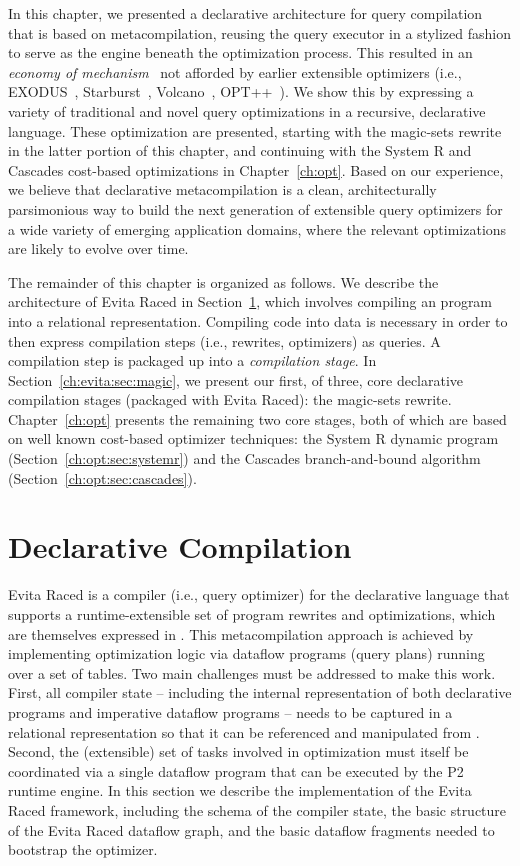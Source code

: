 In this chapter, we presented a declarative architecture for query compilation
that is based on metacompilation, reusing the query executor in a stylized
fashion to serve as the engine beneath the optimization process.  This resulted
in an {\em economy of mechanism}~\cite{Saltzer75theprotection} not afforded by
earlier extensible optimizers (i.e., EXODUS~\cite{exodus},
Starburst~\cite{phh92}, Volcano~\cite{volcano}, OPT++~\cite{opt++}).  We show
this by expressing a variety of traditional and novel query optimizations in a
recursive, declarative language.  These optimization are presented, starting
with the magic-sets rewrite in the latter portion of this chapter, and
continuing with the System R and Cascades cost-based optimizations in
Chapter~\ref{ch:opt}.  Based on our experience, we believe that declarative
metacompilation is a clean, architecturally parsimonious way to build the next
generation of extensible query optimizers for a wide variety of emerging
application domains, where the relevant optimizations are likely to evolve over
time.

The remainder of this chapter is organized as follows.  We describe the
architecture of Evita Raced in Section~\ref{ch:evita:sec:compile}, which
involves compiling an \OVERLOG program into a relational representation.
Compiling code into data is necessary in order to then express compilation
steps (i.e., rewrites, optimizers) as queries.  A compilation step is packaged
up into a {\em compilation stage}.  In Section~\ref{ch:evita:sec:magic}, we
present our first, of three, core declarative compilation stages (packaged with
Evita Raced): the magic-sets rewrite.  Chapter~\ref{ch:opt} presents the
remaining two core stages, both of which are based on well known cost-based
optimizer techniques: the System R dynamic program
(Section~\ref{ch:opt:sec:systemr}) and the Cascades branch-and-bound algorithm
(Section~\ref{ch:opt:sec:cascades}).


\section{Declarative Compilation}
\label{ch:evita:sec:compile}

Evita Raced is a compiler (i.e., query optimizer) for the \OVERLOG
declarative language that supports a runtime-extensible set of program
rewrites and optimizations, which are themselves expressed in \OVERLOG.
This metacompilation approach is achieved by implementing optimization
logic via dataflow programs  (query plans) running over a set of tables.  Two
main challenges must be addressed to make this work.  First, all
compiler state -- including the internal representation of both
declarative \OVERLOG programs and imperative dataflow programs -- needs
to be captured in a relational representation so that it can be
referenced and manipulated from \OVERLOG.  Second, the (extensible) set
of tasks involved in optimization must itself be coordinated via a
single dataflow program that can be executed by the P2 runtime engine.
In this section we describe the implementation of the Evita Raced
framework, including the schema of the compiler state, the basic
structure of the Evita Raced dataflow graph, and the basic dataflow
fragments needed to bootstrap the optimizer.

